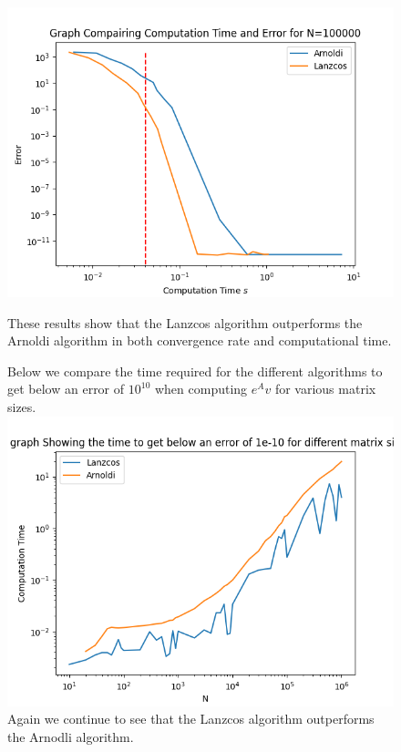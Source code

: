 \documentclass{article}
\begin{document}
\begin{figure}
\begin{minipage}{0.5\textwidth}
	  \label{fig:MEe6}
       \centering
	  \includegraphics[width=\linewidth]{Plots/Comp Time v E Results for N=100000.png}
	  \label{fig:MEe6}
    \end{minipage}
These results show that the Lanzcos algorithm outperforms the Arnoldi algorithm in both convergence rate and computational time.
\end{figure}

\begin{figure}
Below we compare the time required for the different algorithms to get below an error of $10^{10}$ when computing $e^Av$ for various matrix sizes.
\includegraphics[width=\linewidth]{Plots/time to get below an error of 1e-10.png}
\clearpage
Again we continue to see that the Lanzcos algorithm outperforms the Arnodli algorithm.
\end{figure}
\clearpage
\newpage


\end{document}
